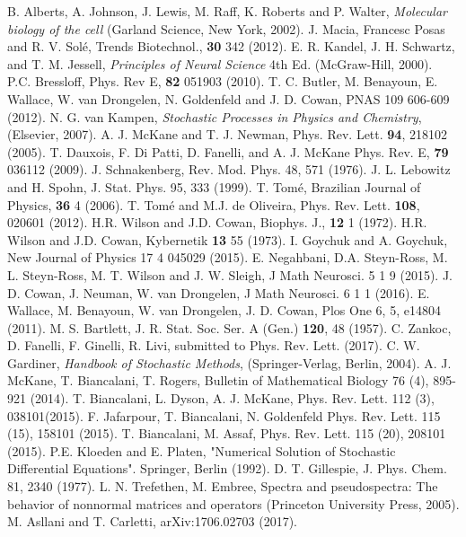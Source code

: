 \documentclass[showpacs,prl,superscriptaddress,nofootinbib, twocolumn]{revtex4}
\begin{document}
\begin{thebibliography}{99}
 B. Alberts, A. Johnson, J. Lewis, M. Raff, K. Roberts and P. Walter, {\it Molecular biology of the cell}  (Garland Science, New York, 2002). 
 J. Macia, Francesc Posas and R. V. Sol\'e, Trends Biotechnol., {\bf 30} 342 (2012).
 E. R. Kandel, J. H. Schwartz, and T. M. Jessell,  {\it Principles of Neural Science} 4th Ed. (McGraw-Hill, 2000).
 P.C. Bressloff, Phys. Rev E, {\bf 82} 051903 (2010).
 T. C. Butler, M. Benayoun, E. Wallace, W. van Drongelen, 
N. Goldenfeld  and J. D. Cowan,  PNAS 109 606-609 (2012).
 N. G. van Kampen, {\it Stochastic Processes in Physics and Chemistry}, (Elsevier, 2007).
 A. J. McKane and T. J. Newman, Phys. Rev. Lett. {\bf 94}, 218102 (2005).
 T. Dauxois, F. Di Patti, D. Fanelli, and A. J. McKane Phys. Rev. E, {\bf 79} 036112 (2009).
 J. Schnakenberg, Rev. Mod. Phys. 48, 571 (1976).
 J. L. Lebowitz and H. Spohn, J. Stat. Phys. 95, 333 (1999).
 T. Tom\'e, Brazilian Journal of Physics, {\bf 36}  4 (2006). 
 T. Tom\'e and M.J. de Oliveira,  Phys. Rev. Lett. {\bf 108}, 020601 (2012).
  H.R. Wilson and J.D. Cowan, Biophys. J., {\bf 12} 1 (1972).
 H.R. Wilson and J.D. Cowan,  Kybernetik {\bf 13} 55 (1973).
 I. Goychuk and A. Goychuk, New Journal of Physics 17 4 045029 (2015).
 E. Negahbani, D.A. Steyn-Ross, M. L. Steyn-Ross, M. T. Wilson and J. W. Sleigh, J Math Neurosci. 5 1 9  (2015).
 J. D. Cowan, J. Neuman, W. van Drongelen, J Math Neurosci. 6 1 1 (2016).
 E. Wallace, M. Benayoun, W. van Drongelen, J. D. Cowan, Plos One 6, 5, e14804 (2011).
 M. S. Bartlett, J. R. Stat. Soc. Ser. A (Gen.) {\bf 120}, 48 (1957).
 C. Zankoc, D. Fanelli, F. Ginelli, R. Livi, submitted to Phys. Rev. Lett. (2017).
 C. W. Gardiner, {\it Handbook of Stochastic Methods},  (Springer-Verlag, Berlin, 2004).
  A. J. McKane, T. Biancalani, T. Rogers, Bulletin of Mathematical Biology 76 (4), 895-921 (2014).
 T. Biancalani, L. Dyson, A. J. McKane, Phys. Rev. Lett. 112 (3), 038101(2015).
 F. Jafarpour, T. Biancalani, N. Goldenfeld
Phys. Rev. Lett. 115 (15), 158101 (2015).
 T. Biancalani, M. Assaf, Phys. Rev. Lett. 115 (20), 208101 (2015).
  P.E. Kloeden and E. Platen, "Numerical Solution of Stochastic Differential Equations". Springer, Berlin (1992).
 D. T. Gillespie, J. Phys. Chem. 81, 2340 (1977).
  L. N. Trefethen, M. Embree, Spectra and pseudospectra: The behavior of nonnormal matrices and operators (Princeton University Press, 2005).
 M. Asllani and T. Carletti,  arXiv:1706.02703 (2017).
\end{thebibliography}
\end{document}

